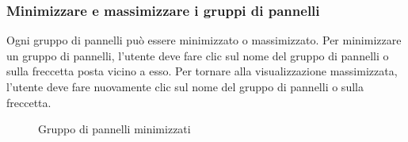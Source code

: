 \subsubsection{Minimizzare e massimizzare i gruppi di pannelli}
Ogni gruppo di pannelli può essere minimizzato o massimizzato. Per minimizzare un gruppo di pannelli, l'utente deve fare clic sul nome del gruppo di pannelli o sulla freccetta posta vicino a esso. Per tornare alla visualizzazione massimizzata, l'utente deve fare nuovamente clic sul nome del gruppo di pannelli o sulla freccetta. \\
\begin{figure}[H]
    \centering
    \caption{Gruppo di pannelli minimizzati}
    \label{fig:my_label}
\end{figure}